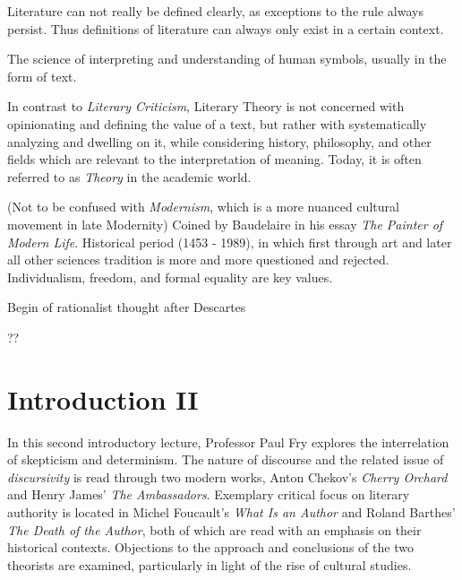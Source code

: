 \documentclass[]{scrartcl}
\begin{document}
\begin{description}[leftmargin=!,labelwidth=\widthof{\bfseries Cartesian Revolution}]
  \item[Literature] Literature can not really be defined clearly, as exceptions to the rule always persist. Thus definitions of literature can always only exist in a certain context.
  \item[Hermeneutics] The science of interpreting and understanding of human symbols, usually in the form of text.
  \item[Literary Theory] In contrast to \emph{Literary Criticism}, Literary Theory is not concerned with opinionating and defining the value of a text, but rather with systematically analyzing and dwelling on it, while considering history, philosophy, and other fields which are relevant to the interpretation of meaning. Today, it is often referred to as \emph{Theory} in the academic world.
  \item[Modernity] (Not to be confused with \emph{Modernism}, which is a more nuanced cultural movement in late Modernity) Coined by Baudelaire in his essay \emph{The Painter of Modern Life}. Historical period (1453 - 1989), in which first through art and later all other sciences tradition is more and more questioned and rejected. Individualism, freedom, and formal equality are key values.
  \item[Cartesian Revolution] Begin of rationalist thought after Descartes
  \item[Verfremdung] ??
\end{description}

\section{Introduction II}

\vspace{15pt}

In this second introductory lecture, Professor Paul Fry explores the interrelation of skepticism and determinism. The nature of discourse and the related issue of \emph{discursivity} is read through two modern works, Anton Chekov's \emph{Cherry Orchard} and Henry James' \emph{The Ambassadors}. Exemplary critical focus on literary authority is located in Michel Foucault's \emph{What Is an Author} and Roland Barthes' \emph{The Death of the Author}, both of which are read with an emphasis on their historical contexts. Objections to the approach and conclusions of the two theorists are examined, particularly in light of the rise of cultural studies.
\end{document}
